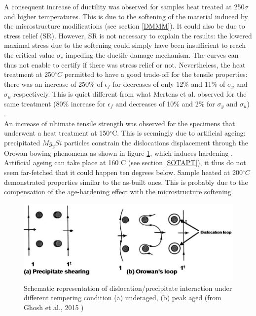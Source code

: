 A consequent increase of ductility was observed for samples heat treated at 250$\sigma$ and higher temperatures. This is due to the softening of the material induced by the microstructure modifications (see section \ref{DMMM}). It could also be due to stress relief (SR). However, SR is not necessary to explain the results: the lowered maximal stress due to the softening could simply have been insufficient to reach the critical value $\sigma_c$ impeding the ductile damage mechanism. The curves can thus not enable to certify if there was stress relief or not. Nevertheless, the heat treatment at 250$^\circ C$ permitted to have a good trade-off for the tensile properties: there was an increase of 250\% of $\epsilon_f$ for decreases of only 12\% and 11\% of $\sigma_y$ and $\sigma_u$ respectively. This is quiet different from what Mertens et al. observed for the same treatment (80\% increase for $\epsilon_f$ and decreases of 10\% and 2\% for $\sigma_y$ and $\sigma_u$) \parencite{Mertens15}.\\

An increase of ultimate tensile strength was observed for the specimens that underwent a heat treatment at 150$^\circ$C. This is seemingly due to artificial ageing: precipitated $Mg_2Si$ particles constrain the dislocations displacement through the Orowan bowing phenomena as shown in figure \ref{fig:Oro}, which induces hardening \parencite{Ghosh}. Artificial ageing can take place at 160$^\circ$C (see section \ref{SOTAPT}), it thus do not seem far-fetched that it could happen ten degrees below. Sample heated at 200$^\circ C$ demonstrated properties similar to the as-built ones. This is probably due to the compensation of the age-hardening effect with the microstructure softening.\\

\begin{figure}[ht]
	\centering
	\centerline{\includegraphics[scale=0.45]{Images/Orowan}}
	\decoRule
	\caption[Schematic representation of dislocation/precipitate interaction under different tempering condition (a) underaged, (b) peak aged]{Schematic representation of dislocation/precipitate interaction under different tempering condition (a) underaged, (b) peak aged (from Ghosh et al., 2015 \parencite{Ghosh})}
	\label{fig:Oro}
\end{figure}

